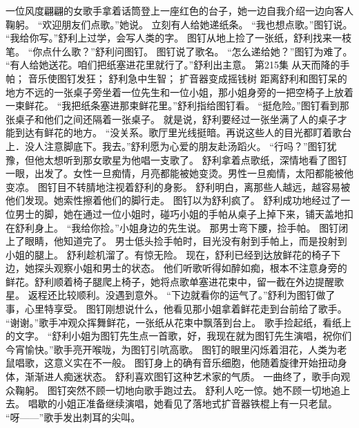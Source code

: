 \documentclass[a4paper,12pt,UTF8,twoside]{ctexbook}
\begin{document}
        一位风度翩翩的女歌手拿着话筒登上一座红色的台子，她一边自我介绍一边向客人鞠躬。 
        “欢迎朋友们点歌。”她说。 
        立刻有人给她递纸条。 
        “我也想点歌。”图钉说。 
        “我给你写。”舒利上过学，会写人类的字。 
        图钉从地上捡了一张纸，舒利找来一枝笔。 
        “你点什么歌？”舒利问图钉。 
        图钉说了歌名。 
        “怎么递给她？”图钉为难了。 
        “有人给她送花。咱们把纸塞进花里就行了。”舒利出主意。   第215集 
        从天而降的手帕； 
        音乐使图钉发狂； 
        舒利急中生智； 
        扩音器变成摇钱树   
        距离舒利和图钉呆的地方不远的一张桌子旁坐着一位先生和一位小姐，那小姐身旁的一把空椅子上放着一束鲜花。 
        “我把纸条塞进那束鲜花里。”舒利指给图钉看。 
        “挺危险。”图钉看到那张桌子和他们之间还隔着一张桌子。 
        就是说，舒利要经过一张坐满了人的桌子才能到达有鲜花的地方。 
        “没关系。歌厅里光线挺暗。再说这些人的目光都盯着歌台上．没人注意脚底下。我去。”舒利愿为心爱的朋友赴汤蹈火。 
        “行吗？”图钉犹豫，但他太想听到那女歌星为他唱一支歌了。 
        舒利拿着点歌纸，深情地看了图钉一眼，出发了。女性一旦痴情，月亮都能被她变烫。男性一旦痴情，太阳都能被他变凉。 
        图钉目不转腈地注视着舒利的身影。 
        舒利明白，离那些人越远，越容易被他们发现。她索性擦着他们的脚行走。 
        图钉以为舒利疯了。 
        舒利成功地经过了一位男士的脚，她在通过一位小姐时，碰巧小姐的手帕从桌子上掉下来，铺天盖地扣在舒利身上。 
        “我给你捡。”小姐身边的先生说。 
        那男士弯下腰，捡手帕。 
        图钉闭上了眼睛，他知道完了。 
        男士低头捡手帕时，目光没有射到手帕上，而是投射到小姐的腿上。 
        舒利趁机溜了。有惊无险。 
        现在，舒利已经到达放鲜花的椅子下边，她探头观察小姐和男士的状态。 
        他们听歌听得如醉如痴，根本不注意身旁的鲜花。舒利顺着椅子腿爬上椅子，她将点歌单塞进花束中，留一截在外边提醒歌星。 
        返程还比较顺利。没遇到意外。 
        “下边就看你的运气了。”舒利为图钉做了事，心里特享受。 
        图钉刚想说什么，他看见那小姐拿着鲜花走到台前给了歌手。 
        “谢谢。”歌手冲观众挥舞鲜花，一张纸从花束中飘落到台上。 
        歌手捡起纸，看纸上的文字。 
        “舒利小姐为图钉先生点一首歌，好，我现在就为图钉先生演唱，祝你们今宵愉快。”歌手亮开喉咙，为图钉引吭高歌。 
        图钉的眼里闪烁着泪花，人类为老鼠唱歌，这意义实在不一般。 
        图钉身上的确有音乐细胞，他随着旋律开始扭动身体，渐渐进人痴迷状态。 
        舒利喜欢图钉这种艺术家的气质。 
        一曲终了，歌手向观众鞠躬。 
        图钉突然不顾一切地向歌手跑过去。 
        舒利人吃一惊。她不顾一切地追上去。 
        唱歇的小姐正准备继续演唱，她看见了落地式扩音器铁棍上有一只老鼠。 
        “呀——”歌手发出刺耳的尖叫。 
\end{document}
